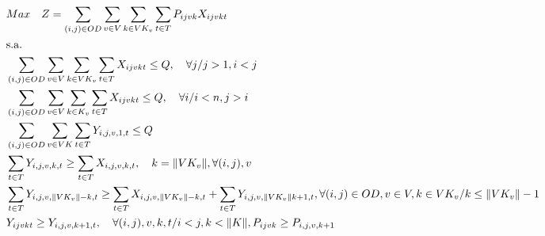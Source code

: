 \begin{align}
	 & Max \quad Z = \sum_{(i,j)\in OD} \sum_{v\in V} \sum_{k\in VK_v} \sum_{t\in T} P_{ijvk} X_{ijvkt}                                                        \label{eq: m2_ecu1}                                                                                                              \\
	 & \text{s.a.}  \notag                                                                                                                                                                                                                                                                      \\
	 & \sum_{(i,j)\in OD}\sum_{v\in V}\sum_{k\in VK_v}\sum_{t\in T}X_{ijvkt} \leq Q , \quad \forall j / j>1, i<j                                               \label{eq: m2_ecu2}                                                                                                              \\
	 & \sum_{(i,j)\in OD}\sum_{v\in V}\sum_{k\in K_v}\sum_{t\in T}X_{ijvkt} \leq Q , \quad \forall i / i<n, j>i                                                \label{eq: m2_ecu3}                                                                                                              \\
	 & \sum_{(i,j) \in OD}\sum_{v\in VK}\sum_{t\in T} Y_{i,j,v,1,t} \leq Q                                                                                     \label{eq: m2_autho_cap}                                                                                                         \\
	 & \sum_{t\in T} Y_{i,j,v,k,t} \geq  \sum_{t\in T} X_{i,j,v,k,t},  \quad k = \lVert VK_v \rVert, \forall(i,j),v                                            \label{eq: m2_autho_jerar}                                                                                                       \\
	 & \sum_{t\in T} Y_{i,j,v,\lVert VK_v \rVert - k,t} \geq  \sum_{t\in T} X_{i,j,v,\lVert VK_v \rVert - k,t} + \sum_{t\in T} Y_{i,j,v,\lVert VK_v \rVert k + 1,t} , \forall(i,j)\in OD,v \in V, k \in VK_v / k \leq \lVert VK_v\rVert - 1            \label{eq: m2_autho_jerar}               \\
	 & Y_{ijvkt} \geq Y_{i,j,v,k+1,t},  \quad \forall (i,j),v,k,t / i < j, k < \lVert K \rVert,  P_{ijvk} \geq P_{i,j,v,k+1}                                   \label{eq: m2_ecu5}                                                                                                              \\

\end{align}
